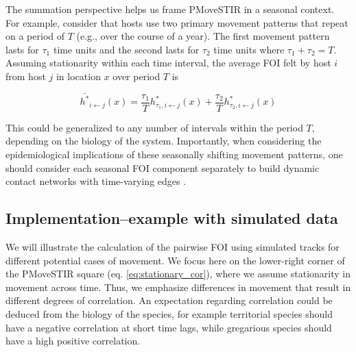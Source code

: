 \documentclass[letterpaper]{article}
\begin{document}
The summation perspective helps us frame PMoveSTIR in a seasonal context.  For example, consider that hosts use two primary movement patterns that repeat on a period of $T$ (e.g., over the course of a year).  The first movement pattern lasts for $\tau_1$ time units and the second lasts for $\tau_2$ time units where $\tau_1 + \tau_2 = T$.  Assuming stationarity within each time interval, the average FOI felt by host $i$ from host $j$ in location $x$ over period $T$ is 

\begin{equation}
\bar{h^*}_{i \leftarrow j}(x) = \frac{\tau_1}{T} h^*_{\tau_1, i \leftarrow j}(x) + \frac{\tau_2}{T} h^*_{\tau_2, i \leftarrow j}(x)
\label{eq:seasonal}
\end{equation}

This could be generalized to any number of intervals within the period $T$, depending on the biology of the system.  Importantly, when considering the epidemiological implications of these seasonally shifting movement patterns, one should consider each seasonal FOI component separately to build dynamic contact networks with time-varying edges \citep{Wilber2022}.

\subsection*{Implementation--example with simulated data}

We will illustrate the calculation of the pairwise FOI using simulated tracks for different potential cases of movement. We focus here on the lower-right corner of the PMoveSTIR square (eq. \ref{eq:stationary_cor}), where we assume stationarity in movement across time. Thus, we emphasize differences in movement that result in different degrees of correlation. An expectation regarding correlation could be deduced from the biology of the species, for example territorial species should have a negative correlation at short time lags, while gregarious species should have a high positive correlation. 
\end{document}

